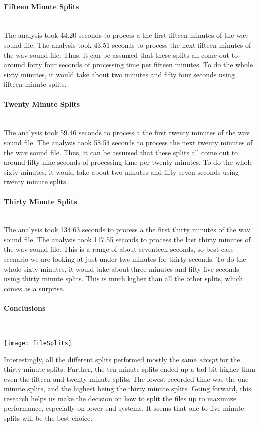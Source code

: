\paragraph{Fifteen Minute Splits} \mbox{}\\[\paragraphheaderspace]
The analysis took 44.20 seconds to process a the first fifteen minutes of the wav sound file. The analysis took 43.51 seconds to process the next fifteen minutes of the wav sound file. Thus, it can be assumed that these splits all come out to around forty four seconds of processing time per fifteen minutes. To do the whole sixty minutes, it would take about two minutes and fifty four seconds using fifteen minute splits.

\paragraph{Twenty Minute Splits} \mbox{}\\[\paragraphheaderspace]
The analysis took 59.46 seconds to process a the first twenty minutes of the wav sound file. The analysis took 58.54 seconds to process the next twenty minutes of the wav sound file. Thus, it can be assumed that these splits all come out to around fifty nine seconds of processing time per twenty minutes. To do the whole sixty minutes, it would take about two minutes and fifty seven seconds using twenty minute splits.

\paragraph{Thirty Minute Splits} \mbox{}\\[\paragraphheaderspace]
The analysis took 134.63 seconds to process a the first thirty minutes of the wav sound file. The analysis took 117.55 seconds to process the last thirty minutes of the wav sound file. This is a range of about seventeen seconds, so best case scenario we are looking at just under two minutes for thirty seconds. To do the whole sixty minutes, it would take about three minutes and fifty five seconds using thirty minute splits. This is much higher than all the other splits, which comes as a surprise.

\paragraph{Conclusions} \mbox{}\\[\paragraphheaderspace]
\begin{center}
	\texttt{[image: fileSplits]}
\end{center}
Interestingly, all the different splits performed mostly the same \textit{except} for the thirty minute splits. Further, the ten minute splits ended up a tad bit higher than even the fifteen and twenty minute splits. The lowest recorded time was the one minute splits, and the highest being the thirty minute splits. Going forward, this research helps us make the decision on how to split the files up to maximize performance, especially on lower end systems. It seems that one to five minute splits will be the best choice.
